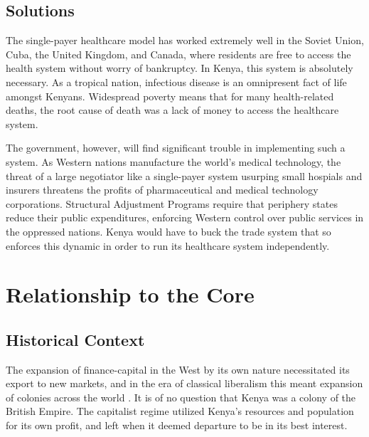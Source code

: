 \documentclass[american]{../../../coursework}
\begin{document}
\subsection{Solutions}

The single-payer healthcare model has worked extremely well in the Soviet
Union, Cuba, the United Kingdom, and Canada, where residents are free to
access the health system without worry of bankruptcy. In Kenya, this system is
absolutely necessary. As a tropical nation, infectious disease is an
omnipresent fact of life amongst Kenyans. Widespread poverty means that for
many health-related deaths, the root cause of death was a lack of money to
access the healthcare system.

The government, however, will find significant trouble in implementing such a
system. As Western nations manufacture the world's medical technology, the
threat of a large negotiator like a single-payer system usurping small
hospials and insurers threatens the profits of pharmaceutical and medical
technology corporations. Structural Adjustment Programs require that periphery
states reduce their public expenditures, enforcing Western control over public
services in the oppressed nations. Kenya would have to buck the trade system
that so enforces this dynamic in order to run its healthcare system
independently.

\section{Relationship to the Core}
\subsection{Historical Context}

The expansion of finance-capital in the West by its own nature necessitated
its export to new markets, and in the era of classical liberalism this meant
expansion of colonies across the world \parencite{Lenin1917}. It is of no
question that Kenya was a colony of the British Empire. The capitalist regime
utilized Kenya's resources and population for its own profit, and left when it
deemed departure to be in its best interest.
\end{document}
